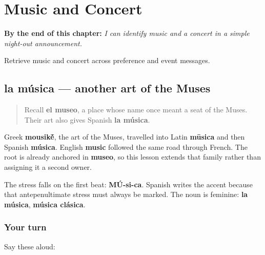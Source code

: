 
\chapter{Music and Concert}
\label{ch:musica-concierto}

\begin{chapteropening}
\textbf{By the end of this chapter:} \emph{I can identify music and a concert in a simple night-out announcement.}

Retrieve music and concert across preference and event messages.
\end{chapteropening}

\section[la música]{la música — another art of the Muses}

\label{lesson:ES-C413-musica}



\begin{quote}
Recall \textbf{el museo}, a place whose name once meant a seat of the Muses. Their art also gives Spanish \textbf{la música}.
\end{quote}

\begin{cousinweb}
Greek \textbf{mousik\'{\={e}}}, the art of the Muses, travelled into Latin \textbf{mūsica} and then Spanish \textbf{música}. English \textbf{music} followed the same road through French. The root is already anchored in \textbf{museo}, so this lesson extends that family rather than assigning it a second owner.
\end{cousinweb}

\begin{grammarlens}[title={Grammar Lens: the written accent}]
The stress falls on the first beat: \textbf{MÚ-si-ca}. Spanish writes the accent because that antepenultimate stress must always be marked. The noun is feminine: \textbf{la música}, \textbf{música clásica}.
\end{grammarlens}

\subsection*{Your turn}
Say these aloud:

